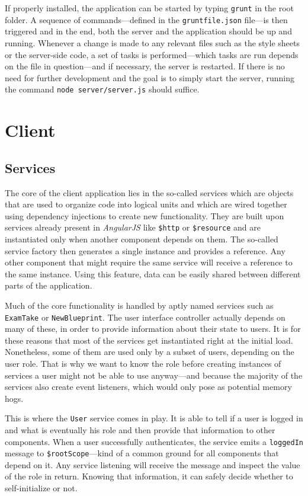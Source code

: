 \documentclass[thesis=M,english,hidelinks]{FITthesis}[2012/10/20]
\newcommand{\code}{\texttt}
\begin{document}
If properly installed, the application can be started by typing \code{grunt} in the root folder. A sequence of commands---defined in the \code{gruntfile.json} file---is then triggered and in the end, both the server and the application should be up and running. Whenever a change is made to any relevant files such as the style sheets or the server-side code, a set of tasks is performed---which tasks are run depends on the file in question---and if necessary, the server is restarted. If there is no need for further development and the goal is to simply start the server, running the command \code{node server/server.js} should suffice.

\section{Client}

  \subsection{Services}

The core of the client application lies in the so-called services which are objects that are used to organize code into logical units and which are wired together using dependency injections to create new functionality. They are built upon services already present in \textit{AngularJS} like \code{\$http} or \code{\$resource}  and are instantiated only when another component depends on them. The so-called service factory then generates a single instance and provides a reference. Any other component that might require the same service will receive a reference to the same instance. Using this feature, data can be easily shared between different parts of the application.

Much of the core functionality is handled by aptly named services such as \code{ExamTake} or \code{NewBlueprint}. The user interface controller actually depends on many of these, in order to provide information about their state to users. It is for these reasons that most of the services get instantiated right at the initial load. Nonetheless, some of them are used only by a subset of users, depending on the user role. That is why we want to know the role before creating instances of services a user might not be able to use anyway---and because the majority of the services also create event listeners, which would only pose as potential memory hogs.

This is where the \code{User} service comes in play. It is able to tell if a user is logged in and what is eventually his role and then provide that information to other components. When a user successfully authenticates, the service emits a \code{loggedIn} message to \code{\$rootScope}---kind of a common ground for all components that depend on it. Any service listening will receive the message and inspect the value of the role in return. Knowing that information, it can safely decide whether to self-initialize or not.
\end{document}
